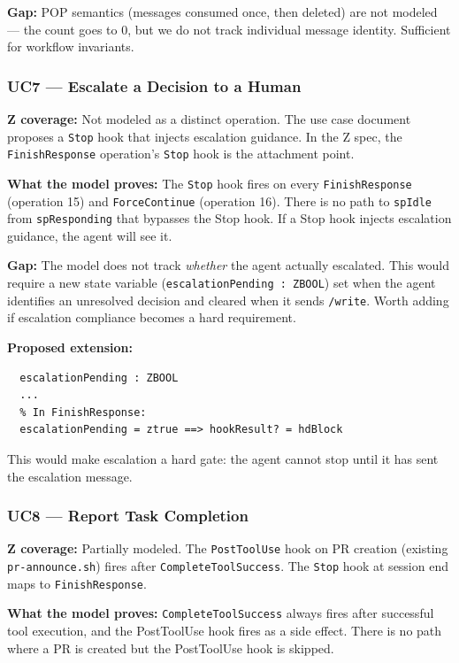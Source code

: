 \documentclass[a4paper,10pt,fleqn]{article}
\begin{document}
\textbf{Gap:} POP semantics (messages consumed once, then deleted) are
not modeled --- the count goes to 0, but we do not track individual
message identity. Sufficient for workflow invariants.

\subsubsection{UC7 --- Escalate a Decision to a Human}

\textbf{Z coverage:} Not modeled as a distinct operation. The use case
document proposes a \texttt{Stop} hook that injects escalation guidance.
In the Z spec, the \texttt{FinishResponse} operation's \texttt{Stop}
hook is the attachment point.

\textbf{What the model proves:} The \texttt{Stop} hook fires on every
\texttt{FinishResponse} (operation 15) and \texttt{ForceContinue}
(operation 16). There is no path to \texttt{spIdle} from
\texttt{spResponding} that bypasses the Stop hook. If a Stop hook
injects escalation guidance, the agent will see it.

\textbf{Gap:} The model does not track \emph{whether} the agent actually
escalated. This would require a new state variable
(\texttt{escalationPending : ZBOOL}) set when the agent identifies an
unresolved decision and cleared when it sends \texttt{/write}. Worth
adding if escalation compliance becomes a hard requirement.

\textbf{Proposed extension:}

\begin{verbatim}
  escalationPending : ZBOOL
  ...
  % In FinishResponse:
  escalationPending = ztrue ==> hookResult? = hdBlock
\end{verbatim}

This would make escalation a hard gate: the agent cannot stop until it
has sent the escalation message.

\subsubsection{UC8 --- Report Task Completion}

\textbf{Z coverage:} Partially modeled. The \texttt{PostToolUse} hook
on PR creation (existing \texttt{pr-announce.sh}) fires after
\texttt{CompleteToolSuccess}. The \texttt{Stop} hook at session end
maps to \texttt{FinishResponse}.

\textbf{What the model proves:} \texttt{CompleteToolSuccess} always
fires after successful tool execution, and the PostToolUse hook fires
as a side effect. There is no path where a PR is created but the
PostToolUse hook is skipped.
\end{document}
